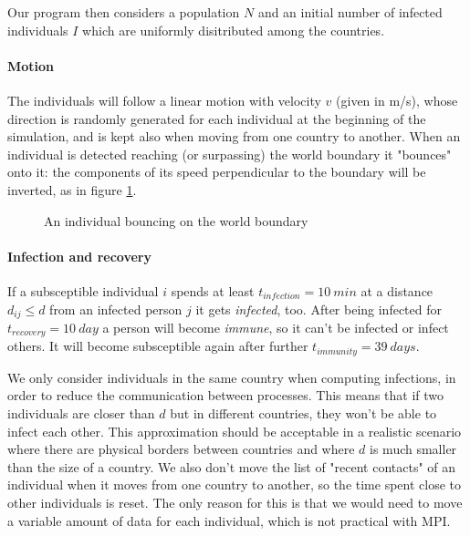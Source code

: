 \noindent
Our program then considers a population $N$ and an initial number of infected individuals $I$ which are uniformly disitributed among the countries. 

\paragraph{Motion}
The individuals will follow a linear motion with velocity $v$ (given in \si{m/s}), whose direction is randomly generated for each individual at the beginning of the simulation, and is kept also when moving from one country to another. When an individual is detected reaching (or surpassing) the world boundary it "bounces" onto it: the components of its speed perpendicular to the boundary will be inverted, as in figure \ref{fig:boundary_bounce}.

\begin{figure}[h]
    \centering
    \caption{An individual bouncing on the world boundary}
    \label{fig:boundary_bounce}
\end{figure}

\paragraph{Infection and recovery}
If a subsceptible individual $i$ spends at least $t_{infection} = \SI{10}{min}$ at a distance $d_{ij}\leq d$ from an infected person $j$ it gets \emph{infected}, too.
After being infected for $t_{recovery} = \SI{10}{day}$ a person will become \emph{immune}, so it can't be infected or infect others. It will become subsceptible again after further $t_{immunity} = \SI{39}{days}$.

We only consider individuals in the same country when computing infections, in order to reduce the communication between processes. This means that if two individuals are closer than $d$ but in different countries, they won't be able to infect each other. This approximation should be acceptable in a realistic scenario where there are physical borders between countries and where $d$ is much smaller than the size of a country. We also don't move the list of "recent contacts" of an individual when it moves from one country to another, so the time spent close to other individuals is reset. The only reason for this is that we would need to move a variable amount of data for each individual, which is not practical with MPI. 

